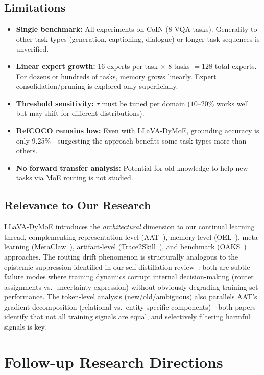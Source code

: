 \documentclass[11pt]{article}
\begin{document}
\subsection{Limitations}

\begin{itemize}
    \item \textbf{Single benchmark:} All experiments on CoIN (8 VQA tasks). Generality to other task types (generation, captioning, dialogue) or longer task sequences is unverified.
    \item \textbf{Linear expert growth:} 16 experts per task $\times$ 8 tasks $= 128$ total experts. For dozens or hundreds of tasks, memory grows linearly. Expert consolidation/pruning is explored only superficially.
    \item \textbf{Threshold sensitivity:} $\tau$ must be tuned per domain ($10$--$20\%$ works well but may shift for different distributions).
    \item \textbf{RefCOCO remains low:} Even with LLaVA-DyMoE, grounding accuracy is only 9.25\%---suggesting the approach benefits some task types more than others.
    \item \textbf{No forward transfer analysis:} Potential for old knowledge to help new tasks via MoE routing is not studied.
\end{itemize}

\subsection{Relevance to Our Research}

LLaVA-DyMoE introduces the \textit{architectural} dimension to our continual learning thread, complementing representation-level (AAT~\cite{aat}), memory-level (OEL~\cite{oel}), meta-learning (MetaClaw~\cite{metaclaw}), artifact-level (Trace2Skill~\cite{trace2skill}), and benchmark (OAKS~\cite{oaks}) approaches. The routing drift phenomenon is structurally analogous to the epistemic suppression identified in our self-distillation review~\cite{selfdistill}: both are subtle failure modes where training dynamics corrupt internal decision-making (router assignments vs.\ uncertainty expression) without obviously degrading training-set performance. The token-level analysis (new/old/ambiguous) also parallels AAT's gradient decomposition (relational vs.\ entity-specific components)---both papers identify that not all training signals are equal, and selectively filtering harmful signals is key.

\section{Follow-up Research Directions}
\end{document}
